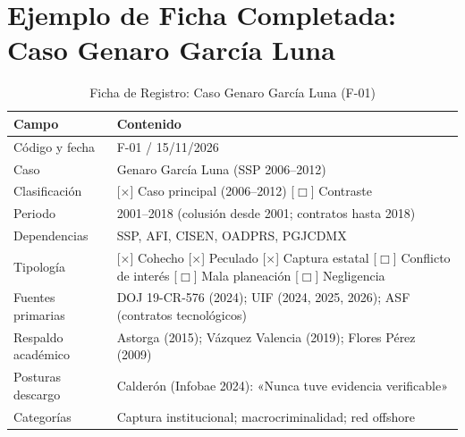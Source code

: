 \section{Ejemplo de Ficha Completada: Caso Genaro García Luna}

\begin{table}[H]
\centering
\caption{Ficha de Registro: Caso Genaro García Luna (F-01)}
\label{tab:ficha_ejemplo}
\small
\begin{tabular}{@{}p{4cm}p{10cm}@{}}
\toprule
\textbf{Campo} & \textbf{Contenido} \\
\midrule
Código y fecha & F-01 / 15/11/2026 \\
\addlinespace
Caso & Genaro García Luna (SSP 2006--2012) \\
\addlinespace
Clasificación & [$\times$] Caso principal (2006--2012) [$\Box$] Contraste \\
\addlinespace
Periodo & 2001--2018 (colusión desde 2001; contratos hasta 2018) \\
\addlinespace
Dependencias & SSP, AFI, CISEN, OADPRS, PGJCDMX \\
\addlinespace
Tipología & [$\times$] Cohecho [$\times$] Peculado [$\times$] Captura estatal [$\Box$] Conflicto de interés [$\Box$] Mala planeación [$\Box$] Negligencia \\
\addlinespace
Fuentes primarias & DOJ 19-CR-576 (2024); UIF (2024, 2025, 2026); ASF (contratos tecnológicos) \\
\addlinespace
Respaldo académico & Astorga (2015); Vázquez Valencia (2019); Flores Pérez (2009) \\
\addlinespace
Posturas descargo & Calderón (Infobae 2024): «Nunca tuve evidencia verificable» \\
\addlinespace
Categorías & Captura institucional; macrocriminalidad; red offshore \\
\bottomrule
\end{tabular}
\end{table}